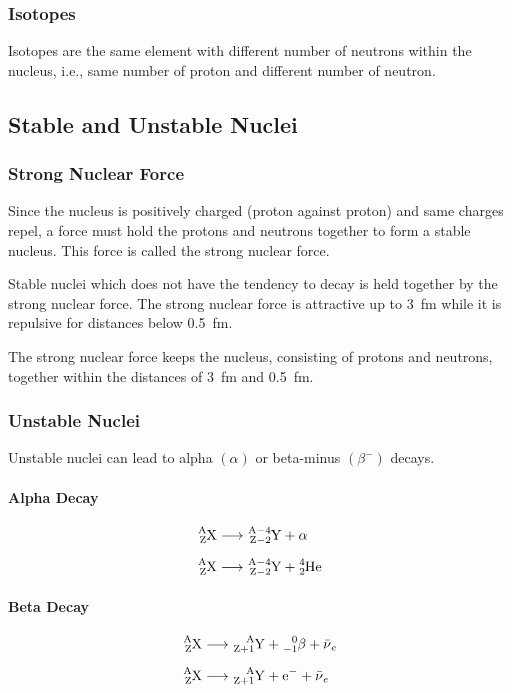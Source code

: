 \documentclass[10pt]{article}
\begin{document}
\begin{multicols}{2}
	\subsubsection{Isotopes}
	Isotopes are the same element with different number of neutrons within the
	nucleus, i.e., same number of proton and different number of neutron.

	\subsection{Stable and Unstable Nuclei}
	\subsubsection{Strong Nuclear Force}
	Since the nucleus is positively charged (proton against proton) and same charges
	repel, a force must hold the protons and neutrons together to form a stable
	nucleus. This force is called the strong nuclear force.
	\medskip

	Stable nuclei which does not have the tendency to decay is held together by
	the strong nuclear force. The strong nuclear force is attractive up to
	\qty{3}{\femto\meter} while it is repulsive for distances below
	\qty{0.5}{\femto\meter}.
	\medskip

	The strong nuclear force keeps the nucleus, consisting of protons and neutrons,
	together within the distances of \qty{3}{\femto\meter} and
	\qty{0.5}{\femto\meter}.

	\subsubsection{Unstable Nuclei}
	Unstable nuclei can lead to alpha $(\alpha)$ or beta-minus $(\beta^{-})$ decays.
	\paragraph{Alpha Decay}
	\begin{align}
		\ce{^A_ZX} & \longrightarrow \ce{^{A-4}_{Z-2}Y} + \alpha
		\\[\medskipamount]
		\ce{^A_ZX} & \longrightarrow \ce{^{A-4}_{Z-2}Y} + \ce{^{4}_{2}He}
	\end{align}

	\paragraph{Beta Decay}
	\begin{align}
		\ce{^A_ZX} & \longrightarrow \ce{^A_{Z+1}Y + \ce{^{0}_{-1}\beta} + \bar{\nu}_e}
		\\[\medskipamount]
		\ce{^A_ZX} & \longrightarrow \ce{^A_{Z+1}Y + e^{-} + \bar{\nu}_e}
	\end{align}


\end{multicols}
\end{document}
